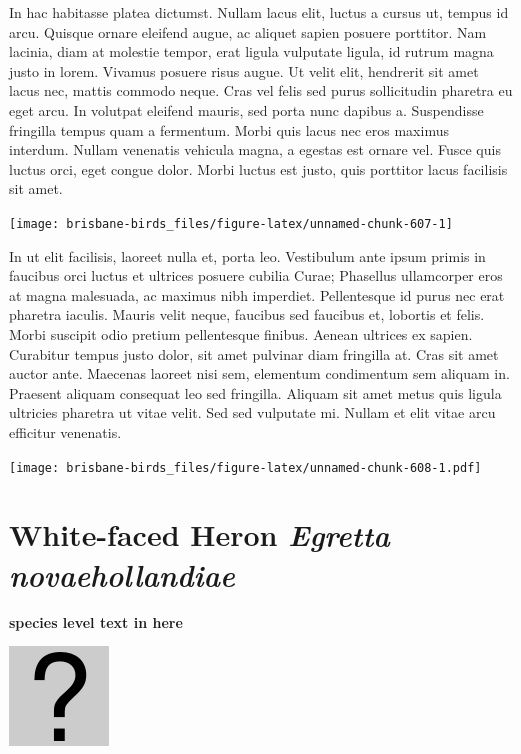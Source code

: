 \documentclass[]{book}
\let\origfigure\figure
\let\endorigfigure\endfigure
\renewenvironment{figure}[1][2] {
  \expandafter\origfigure\expandafter[H]
} {
  \endorigfigure
}
\begin{document}
In hac habitasse platea dictumst. Nullam lacus elit, luctus a cursus ut,
tempus id arcu. Quisque ornare eleifend augue, ac aliquet sapien posuere
porttitor. Nam lacinia, diam at molestie tempor, erat ligula vulputate
ligula, id rutrum magna justo in lorem. Vivamus posuere risus augue. Ut
velit elit, hendrerit sit amet lacus nec, mattis commodo neque. Cras vel
felis sed purus sollicitudin pharetra eu eget arcu. In volutpat eleifend
mauris, sed porta nunc dapibus a. Suspendisse fringilla tempus quam a
fermentum. Morbi quis lacus nec eros maximus interdum. Nullam venenatis
vehicula magna, a egestas est ornare vel. Fusce quis luctus orci, eget
congue dolor. Morbi luctus est justo, quis porttitor lacus facilisis sit
amet.

\begin{figure}
\texttt{[image: brisbane-birds\_files/figure-latex/unnamed-chunk-607-1]} \caption{insert figure caption}\label{fig:unnamed-chunk-607}
\end{figure}

In ut elit facilisis, laoreet nulla et, porta leo. Vestibulum ante ipsum
primis in faucibus orci luctus et ultrices posuere cubilia Curae;
Phasellus ullamcorper eros at magna malesuada, ac maximus nibh
imperdiet. Pellentesque id purus nec erat pharetra iaculis. Mauris velit
neque, faucibus sed faucibus et, lobortis et felis. Morbi suscipit odio
pretium pellentesque finibus. Aenean ultrices ex sapien. Curabitur
tempus justo dolor, sit amet pulvinar diam fringilla at. Cras sit amet
auctor ante. Maecenas laoreet nisi sem, elementum condimentum sem
aliquam in. Praesent aliquam consequat leo sed fringilla. Aliquam sit
amet metus quis ligula ultricies pharetra ut vitae velit. Sed sed
vulputate mi. Nullam et elit vitae arcu efficitur venenatis.

\begin{figure}
\centering
\texttt{[image: brisbane-birds\_files/figure-latex/unnamed-chunk-608-1.pdf]}
\caption{\label{fig:unnamed-chunk-608}insert figure caption}
\end{figure}

\section{\texorpdfstring{White-faced Heron \emph{Egretta
novaehollandiae}}{White-faced Heron Egretta novaehollandiae}}\label{white-faced-heron-egretta-novaehollandiae}

\textbf{species level text in here}

\begin{figure}
\centering
\includegraphics{assets/missing.png}
\caption{No image for species}
\end{figure}
\end{document}
